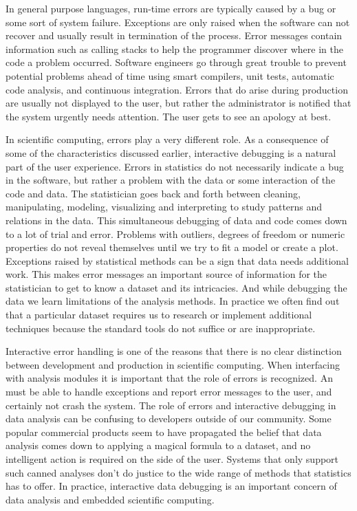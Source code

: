 In general purpose languages, run-time errors are typically caused by a bug or some sort of system failure. Exceptions are only raised when the software can not recover and usually result in termination of the process. Error messages contain information such as calling stacks to help the programmer discover where in the code a problem occurred. Software engineers go through great trouble to prevent potential problems ahead of time using smart compilers, unit tests, automatic code analysis, and continuous integration. Errors that do arise during production are usually not displayed to the user, but rather the administrator is notified that the system urgently needs attention. The user gets to see an apology at best.

In scientific computing, errors play a very different role. As a consequence of some of the characteristics discussed earlier, interactive debugging is a natural part of the user experience. Errors in statistics do not necessarily indicate a bug in the software, but rather a problem with the data or some interaction of the code and data. The statistician goes back and forth between cleaning, manipulating, modeling, visualizing and interpreting to study patterns and relations in the data. This simultaneous debugging of data and code comes down to a lot of trial and error. Problems with outliers, degrees of freedom or numeric properties do not reveal themselves until we try to fit a model or create a plot. Exceptions raised by statistical methods can be a sign that data needs additional work. This makes error messages an important source of information for the statistician to get to know a dataset and its intricacies. And while debugging the data we learn limitations of the analysis methods. In practice we often find out that a particular dataset requires us to research or implement additional techniques because the standard tools do not suffice or are inappropriate.

Interactive error handling is one of the reasons that there is no clear distinction between development and production in scientific computing. When interfacing with analysis modules it is important that the role of errors is recognized. An \API must be able to handle exceptions and report error messages to the user, and certainly not crash the system. The role of errors and interactive debugging in data analysis can be confusing to developers outside of our community. Some popular commercial products seem to have propagated the belief that data analysis comes down to applying a magical formula to a dataset, and no intelligent action is required on the side of the user. Systems that only support such canned analyses don't do justice to the wide range of methods that statistics has to offer. In practice, interactive data debugging is an important concern of data analysis and embedded scientific computing.

